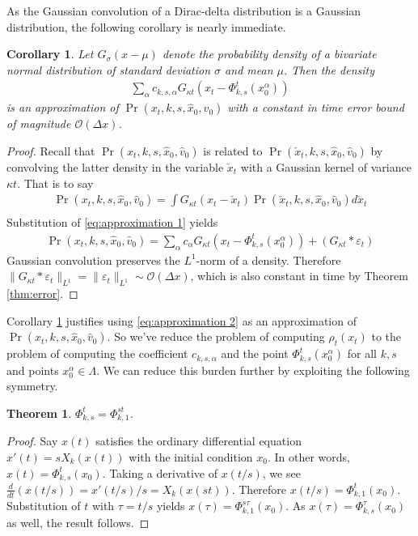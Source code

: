 \documentclass[conference]{IEEEtran}
\newtheorem{thm}{Theorem}
\newtheorem{cor}{Corollary}
\begin{document}
As the Gaussian convolution of a Dirac-delta distribution is a Gaussian distribution, the following corollary is nearly immediate.
\begin{cor} \label{cor:error}
	Let $G_{\sigma}(x-\mu)$ denote the probability density of a bivariate normal distribution of standard deviation $\sigma$ and mean $\mu$.
	Then the density
	\begin{align}
		\sum_\alpha c_{k,s,\alpha} G_{\kappa t}( x_t - \Phi_{k,s}^t( x_0^{\alpha}) ) \label{eq:approximation 2}
	\end{align}
	is an approximation of $\Pr( x_t, k, s, \hat{x}_0, \hat{v}_0)$
	with a constant in time error bound of magnitude $\mathcal{O}( \Delta x)$.
\end{cor}
\begin{proof}
	Recall that $\Pr( x_t, k, s, \hat{x}_0, \hat{v}_0)$ is related to $\Pr( \check{x}_t, k,s,\hat{x}_0, \hat{v}_0)$ by convolving the latter density in the variable $\check{x}_t$ with a Gaussian kernel of variance $\kappa t$.
	That is to say
	\begin{align*}
		\Pr(x_t, k, s, \hat{x}_0, \hat{v}_0) = \int G_{\kappa t}( x_t - \check{x}_t) \Pr( \check{x}_t, k,s,\hat{x}_0, \hat{v}_0) d\check{x}_t \\
	\end{align*}
	Substitution of \eqref{eq:approximation 1} yields
	\begin{align*}
		\Pr(x_t, k, s, \hat{x}_0, \hat{v}_0) = \sum_\alpha c_{\alpha} G_{\kappa t}( x_t - \Phi_{k,s}^t( x_0^{\alpha}) ) + (G_{\kappa t} * \varepsilon_t )
	\end{align*}
	Gaussian convolution preserves the $L^1$-norm of a density.
	Therefore $\| G_{\kappa t} * \varepsilon_t \|_{L^1} = \| \varepsilon_t \|_{L^1} \sim \mathcal{O}(\Delta x)$, which is also constant in time by Theorem \ref{thm:error}.
\end{proof}

Corollary \ref{cor:error} justifies using \eqref{eq:approximation 2} as an approximation of $\Pr( x_t, k,s,\hat{x}_0, \hat{v}_0)$.
So we've reduce the problem of computing $\rho_t(x_t)$ to the problem of computing the coefficient $c_{k,s,\alpha}$ and the point $\Phi_{k,s}^t(x_0^\alpha)$ for all $k,s$ and points $x_0^{\alpha} \in \Lambda$.
We can reduce this burden further by exploiting the following symmetry.
\begin{thm}
	$\Phi_{k,s}^t = \Phi_{k,1}^{st}$.
\end{thm}
\begin{proof}
	Say $x(t)$ satisfies the ordinary differential equation $x'(t) = sX_k(x(t))$ with the initial condition $x_0$.
	In other words, $x(t) = \Phi_{k,s}^{t}(x_0)$.
	Taking a derivative of $x(t/s)$, we see $\frac{d}{dt} (x(t/s)) = x'(t/s) /s = X_k(x(st))$.
	Therefore $x(t/s) = \Phi_{k,1}^{t}( x_0)$.
	Substitution of $t$ with $\tau = t/s$ yields $x(\tau) = \Phi_{k,1}^{s \tau} (x_0)$.
	As $x(\tau) = \Phi_{k,s}^{\tau}(x_0)$ as well, the result follows.
\end{proof}
\end{document}
